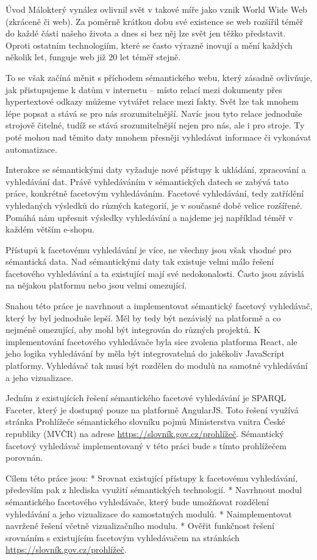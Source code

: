 \chap [uvod] Úvod
Málokterý vynález ovlivnil svět v takové míře jako vznik World Wide Web (zkráceně  či web). 
Za poměrně krátkou dobu své existence se web rozšířil téměř do každé části našeho života a dnes si bez něj lze svět jen těžko představit. 
Oproti ostatním  technologiím, které se často výrazně inovují a mění každých několik let, funguje web již 20 let téměř stejně.

To se však začíná měnit s příchodem sémantického webu, který zásadně ovlivňuje, jak přistupujeme k datům v internetu – místo relací mezi dokumenty přes hypertextové odkazy můžeme vytvářet relace mezi fakty. 
Svět lze tak mnohem lépe popsat a stává se pro nás srozumitelnější. 
Navíc jsou tyto relace jednoduše strojově čitelné, tudíž se stává srozumitelnější nejen pro nás, ale i pro stroje. 
Ty poté mohou nad těmito daty mnohem přesněji vyhledávat informace či vykonávat automatizace. 

Interakce se sémantickými daty vyžaduje nové přístupy k ukládání, zpracování a vyhledávání dat. 
Právě vyhledáváním v sémantických datech se zabývá tato práce, konkrétně facetovým vyhledáváním. 
Facetové vyhledávání, tedy zatřídění vyhledaných výsledků do různých kategorií, je v současné době velice rozšířené. 
Pomáhá nám upřesnit výsledky vyhledávání a najdeme jej například téměř v každém větším e-shopu. 

Přístupů k facetovému vyhledávání je více, ne všechny jsou však vhodné pro sémantická data. 
Nad sémantickými daty tak existuje velmi málo řešení facetového vyhledávání a ta existující mají své nedokonalosti.
Často jsou závislá na nějakou platformu nebo jsou velmi omezující.

Snahou této práce je navrhnout a implementovat sémantický facetový vyhledávač, který by byl jednoduše lepší.
Měl by tedy být nezávislý na platformě a co nejméně omezující, aby mohl být integrován do různých projektů.
K implementování facetového vyhledávače byla sice zvolena platforma React, ale jeho logika vyhledávání by měla být integrovatelná do jakékoliv JavaScript platformy.
Vyhledávač tak musí být rozdělen do modulů na samotné vyhledávání a jeho vizualizace.

Jedním z existujících řešení sémantického facetové vyhledávání je SPARQL Faceter, který je dostupný pouze na platformě AngularJS.
Toto řešení využívá stránka Prohlížeče sémantického slovníku pojmů Ministerstva vnitra České republiky (MVČR) na adrese \url{https://slovník.gov.cz/prohlížeč}.
Sémantický facetový vyhledávač implementovaný v této práci bude s tímto prohlížečem porovnán.
\nl\nl

\midinsert
Cílem této práce jsou:
\begitems
* Srovnat existující přístupy k facetovému vyhledávání, především pak z hlediska využití sémantických technologií.
* Navrhnout modul sémantického facetového vyhledávače, který bude umožňovat rozdělení vyhledávání a jeho vizualizace do samostatných modulů.
* Naimplementovat navržené řešení včetně vizualizačního modulu.
* Ověřit funkčnost řešení srovnáním s existujícím facetovým vyhledávačem na stránkách \url{https://slovník.gov.cz/prohlížeč}.
\enditems
\endinsert
